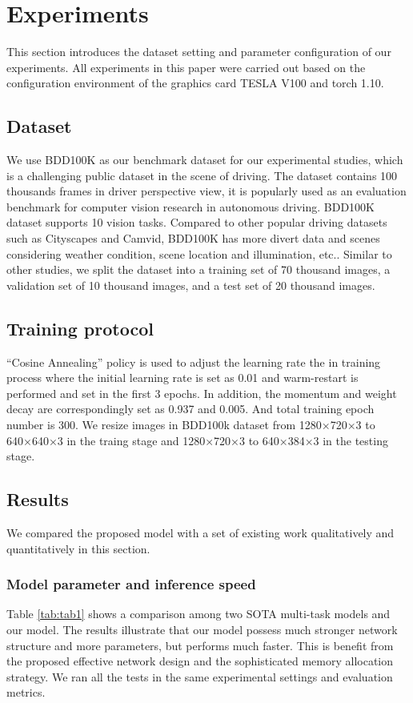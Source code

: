 \documentclass[10pt,twocolumn,letterpaper]{article}
\begin{document}
\section{Experiments} \label{sec:experiments}
This section introduces the dataset setting and parameter configuration of our experiments. All experiments in this paper were carried out based on the configuration environment of the graphics card TESLA V100 and torch 1.10.

\subsection{Dataset}
We use BDD100K as our benchmark dataset for our experimental studies, which is a challenging public dataset in the scene of driving. The dataset contains 100 thousands frames in driver perspective view, it is popularly used as an evaluation benchmark for computer vision research in autonomous driving. 
BDD100K dataset supports 10 vision tasks. Compared to other popular driving datasets such as Cityscapes and Camvid, BDD100K has more divert data and scenes considering weather condition, scene location and illumination, etc..
Similar to other studies, we split the dataset into a training set of 70 thousand images, a validation set of 10 thousand images, and a test set of 20 thousand images. 

\subsection{Training protocol}
“Cosine Annealing” policy is used to adjust the learning rate the in training process where the initial learning rate is set as 0.01 and warm-restart \cite{loshchilov2016sgdr} is performed and set in the first 3 epochs. In addition, the momentum and weight decay are correspondingly set as 0.937 and 0.005. And total training epoch number is 300. We resize images in BDD100k dataset from
1280×720×3 to 640×640×3 in the traing stage and 1280×720×3 to 640×384×3 in the testing stage.

\subsection{Results}
We compared the proposed model with a set of existing work qualitatively and quantitatively in this section.

\subsubsection{Model parameter and inference speed}
Table \ref{tab:tab1} shows a comparison among two SOTA multi-task models and our model. The results illustrate that our model possess much stronger network structure and more parameters, but performs much faster. This is benefit from the proposed effective network design and the sophisticated memory allocation strategy. We ran all the tests in the same experimental settings and evaluation metrics.
\end{document}
